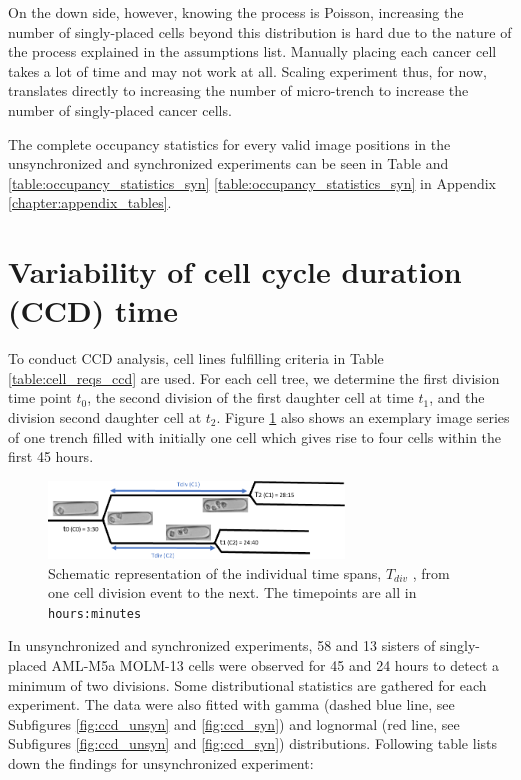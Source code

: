 \documentclass[pdftex,12pt,a4paper]{report}
\begin{document}
On the down side, however, knowing the process is Poisson, increasing the number of singly-placed cells beyond this distribution is hard due to the nature of the process explained in the assumptions list. Manually placing each cancer cell takes a lot of time and may not work at all. Scaling experiment thus, for now, translates directly to increasing the number of micro-trench to increase the number of singly-placed cancer cells.

The complete occupancy statistics for every valid image positions in the unsynchronized and synchronized experiments can be seen in Table and \ref{table:occupancy_statistics_syn} \ref{table:occupancy_statistics_syn} in Appendix \ref{chapter:appendix_tables}.

\section{Variability of cell cycle duration (CCD) time}
\label{section:cell_cycle_duration}

To conduct CCD analysis, cell lines fulfilling criteria in Table \ref{table:cell_reqs_ccd} are used. For each cell tree, we determine the first division time point $t_0$, the second division of the first daughter cell at time $t_1$, and the division second daughter cell at $t_2$. Figure \ref{fig:ccd_schema} also shows an exemplary image series of one trench filled with initially one cell which gives rise to four cells within the first 45 hours. 

\begin{figure}[H]
\centering
\includegraphics[width=0.7\textwidth]{images/divs/cell_graphics.pdf}
\caption{Schematic representation of the individual time spans, $T_{div}$ , from one cell division event to the next. The timepoints are all in \texttt{hours:minutes}}
\label{fig:ccd_schema}
\end{figure}

In unsynchronized and synchronized experiments, 58 and 13 sisters of singly-placed AML-M5a MOLM-13 cells were observed for 45 and 24 hours to detect a minimum of two divisions. Some distributional statistics are gathered for each experiment. The data were also fitted with gamma (dashed blue line, see Subfigures \ref{fig:ccd_unsyn} and \ref{fig:ccd_syn}) and lognormal (red line, see Subfigures \ref{fig:ccd_unsyn} and \ref{fig:ccd_syn}) distributions.  Following table lists down the findings for unsynchronized experiment:
\end{document}
